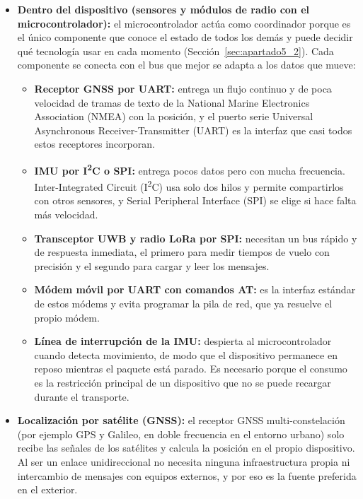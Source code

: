 \documentclass[11pt,a4paper]{article}
\begin{document}
\begin{itemize}
    \item \textbf{Dentro del dispositivo (sensores y módulos de radio con el microcontrolador):} el microcontrolador actúa como coordinador porque es el único componente que conoce el estado de todos los demás y puede decidir qué tecnología usar en cada momento (Sección~\ref{sec:apartado5_2}). Cada componente se conecta con el bus que mejor se adapta a los datos que mueve:
    \begin{itemize}
        \item \textbf{Receptor GNSS por UART:} entrega un flujo continuo y de poca velocidad de tramas de texto de la National Marine Electronics Association (NMEA) con la posición, y el puerto serie Universal Asynchronous Receiver-Transmitter (UART) es la interfaz que casi todos estos receptores incorporan.

        \item \textbf{IMU por I\textsuperscript{2}C o SPI:} entrega pocos datos pero con mucha frecuencia. Inter-Integrated Circuit (I\textsuperscript{2}C) usa solo dos hilos y permite compartirlos con otros sensores, y Serial Peripheral Interface (SPI) se elige si hace falta más velocidad.

        \item \textbf{Transceptor UWB y radio LoRa por SPI:} necesitan un bus rápido y de respuesta inmediata, el primero para medir tiempos de vuelo con precisión y el segundo para cargar y leer los mensajes.

        \item \textbf{Módem móvil por UART con comandos AT:} es la interfaz estándar de estos módems y evita programar la pila de red, que ya resuelve el propio módem.

        \item \textbf{Línea de interrupción de la IMU:} despierta al microcontrolador cuando detecta movimiento, de modo que el dispositivo permanece en reposo mientras el paquete está parado. Es necesario porque el consumo es la restricción principal de un dispositivo que no se puede recargar durante el transporte.
    \end{itemize}

    \item \textbf{Localización por satélite (GNSS):} el receptor GNSS multi-constelación (por ejemplo GPS y Galileo, en doble frecuencia en el entorno urbano) solo recibe las señales de los satélites y calcula la posición en el propio dispositivo. Al ser un enlace unidireccional no necesita ninguna infraestructura propia ni intercambio de mensajes con equipos externos, y por eso es la fuente preferida en el exterior.


\end{itemize}
\end{document}
